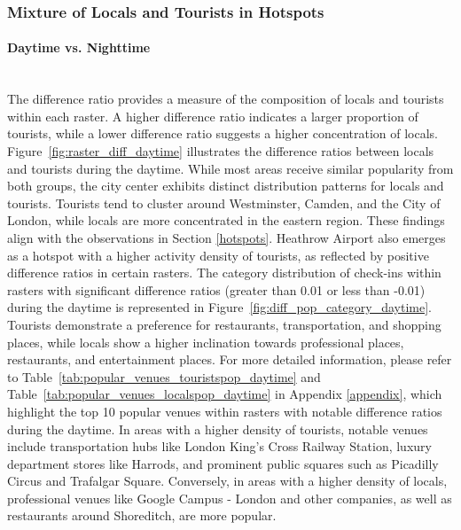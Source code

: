 \documentclass{article}
\newcommand{\subsubsubsection}[1]{\paragraph{#1}\mbox{}\\}
\begin{document}
\subsubsection{Mixture of Locals and Tourists in Hotspots}

\subsubsubsection{Daytime vs. Nighttime}
The difference ratio provides a measure of the composition of locals and tourists within each raster. A higher difference ratio indicates a larger proportion of tourists, while a lower difference ratio suggests a higher concentration of locals. Figure~\ref{fig:raster_diff_daytime} illustrates the difference ratios between locals and tourists during the daytime. While most areas receive similar popularity from both groups, the city center exhibits distinct distribution patterns for locals and tourists. Tourists tend to cluster around Westminster, Camden, and the City of London, while locals are more concentrated in the eastern region. These findings align with the observations in Section \ref{hotspots}. Heathrow Airport also emerges as a hotspot with a higher activity density of tourists, as reflected by positive difference ratios in certain rasters. The category distribution of check-ins within rasters with significant difference ratios (greater than 0.01 or less than -0.01) during the daytime is represented in Figure~\ref{fig:diff_pop_category_daytime}. Tourists demonstrate a preference for restaurants, transportation, and shopping places, while locals show a higher inclination towards professional places, restaurants, and entertainment places. For more detailed information, please refer to Table~\ref{tab:popular_venues_touristspop_daytime} and Table~\ref{tab:popular_venues_localspop_daytime} in Appendix \ref{appendix}, which highlight the top 10 popular venues within rasters with notable difference ratios during the daytime. In areas with a higher density of tourists, notable venues include transportation hubs like London King's Cross Railway Station, luxury department stores like Harrods, and prominent public squares such as Picadilly Circus and Trafalgar Square. Conversely, in areas with a higher density of locals, professional venues like Google Campus - London and other companies, as well as restaurants around Shoreditch, are more popular.
\end{document}
